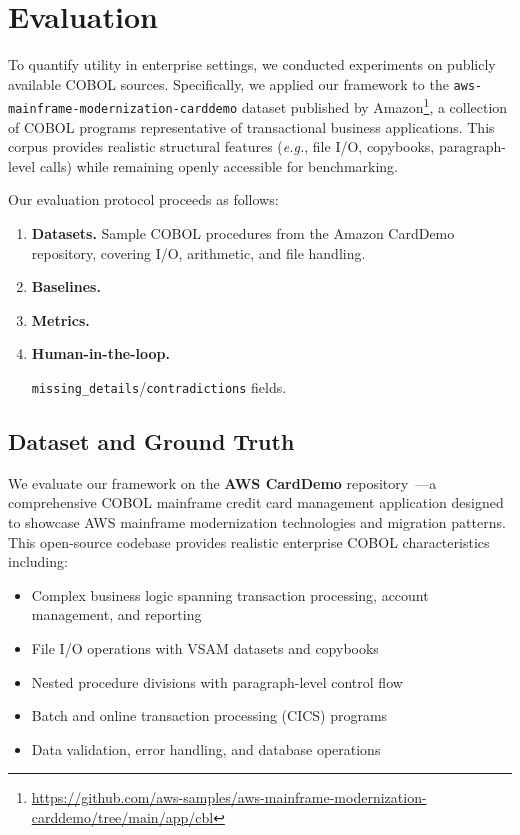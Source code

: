 \section{Evaluation}
To quantify utility in enterprise settings, we conducted experiments 
on publicly available COBOL sources. Specifically, we applied our 
framework to the \texttt{aws-mainframe-modernization-carddemo} dataset 
published by Amazon\footnote{\url{https://github.com/aws-samples/aws-mainframe-modernization-carddemo/tree/main/app/cbl}}, 
a collection of COBOL programs representative of transactional 
business applications. This corpus provides realistic structural features 
(\emph{e.g.}, file I/O, copybooks, paragraph-level calls) while remaining 
openly accessible for benchmarking.

Our evaluation protocol proceeds as follows:
\begin{enumerate}[label=(\roman*),nosep]
  \item \textbf{Datasets.} Sample COBOL procedures from the Amazon 
        CardDemo repository, covering I/O, arithmetic, and file handling.
  \item \textbf{Baselines.} 
  \item \textbf{Metrics.} 
  \item \textbf{Human-in-the-loop.} 


        \texttt{missing\_details}/\texttt{contradictions} fields.
\end{enumerate}

\subsection{Dataset and Ground Truth}

We evaluate our framework on the \textbf{AWS CardDemo} repository~\cite{awscardsdemo}---a comprehensive COBOL mainframe credit card management application designed to showcase AWS mainframe modernization technologies and migration patterns. This open-source codebase provides realistic enterprise COBOL characteristics including:
\begin{itemize}
    \item Complex business logic spanning transaction processing, account management, and reporting
    \item File I/O operations with VSAM datasets and copybooks
    \item Nested procedure divisions with paragraph-level control flow
    \item Batch and online transaction processing (CICS) programs
    \item Data validation, error handling, and database operations
\end{itemize}

